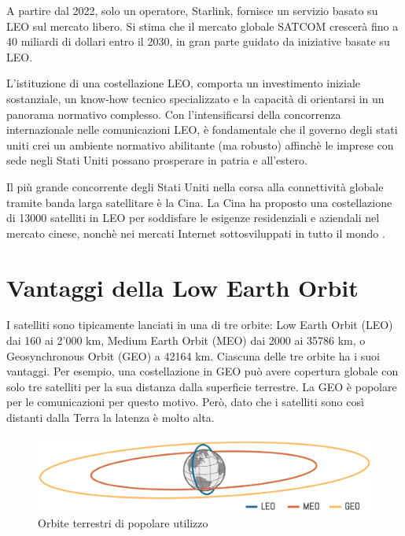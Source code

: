 A partire dal 2022, solo un operatore, Starlink, fornisce un servizio basato su \ac{LEO} sul mercato libero.
Si stima che il mercato globale SATCOM crescerà fino a 40 miliardi di dollari entro il 2030, in gran parte guidato da iniziative basate su \ac{LEO}.

L'istituzione di una costellazione \ac{LEO}, comporta un investimento iniziale sostanziale, un know-how tecnico specializzato e la capacità di orientarsi in un panorama normativo complesso.
Con l'intensificarsi della concorrenza internazionale nelle comunicazioni \ac{LEO}, è fondamentale che il governo degli stati uniti crei un ambiente normativo abilitante (ma robusto) affinchè le imprese con sede negli Stati Uniti possano prosperare in patria e all'estero.

Il più grande concorrente degli Stati Uniti nella corsa alla connettività globale tramite banda larga satellitare è la Cina.
La Cina ha proposto una costellazione di 13000 satelliti in \ac{LEO} per soddisfare le esigenze residenziali e aziendali nel mercato cinese, nonchè nei mercati Internet sottosviluppati in tutto il mondo \cite{makena_young_low_2022}.

\section{Vantaggi della Low Earth Orbit}

I satelliti sono tipicamente lanciati in una di tre orbite: Low Earth Orbit (\ac{LEO}) dai 160 ai 2'000 km, Medium Earth Orbit (\ac{MEO}) dai 2000 ai 35786 km, o Geosynchronous Orbit (GEO) a 42164 km.
Ciascuna delle tre orbite ha i suoi vantaggi.
Per esempio, una costellazione in GEO può avere copertura globale con solo tre satelliti per la sua distanza dalla superficie terrestre.
La GEO è popolare per le comunicazioni per questo motivo.
Però, dato che i satelliti sono così distanti dalla Terra la latenza è molto alta.

\begin{figure}[htbp]
  \centering
  \includegraphics[width=0.9\linewidth]{./res/img/leo_orbit.png}
  \caption{Orbite terrestri di popolare utilizzo \cite{thomas_g_roberts_popular_2022}}
  \label{fig:leo-orbit}
\end{figure}

